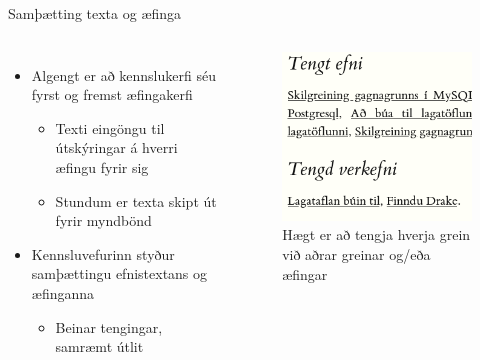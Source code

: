 \documentclass{beamer}
\begin{document}
\begin{frame}{Samþætting texta og æfinga}
    \begin{columns}
        \begin{itemize}
            \item Algengt er að kennslukerfi séu fyrst og fremst æfingakerfi
            \begin{itemize}
                \item Texti eingöngu til útskýringar á hverri æfingu fyrir sig
                \item Stundum er texta skipt út fyrir myndbönd
            \end{itemize}
            \item Kennsluvefurinn styður samþættingu efnistextans og æfinganna
            \begin{itemize}
                \item Beinar tengingar, samræmt útlit
            \end{itemize}
        \end{itemize}
        \begin{figure}
            \caption{Hægt er að tengja hverja grein við aðrar greinar og/eða æfingar}
            \includegraphics[width=\linewidth]{suggestions}
        \end{figure}
    \end{columns}
\end{frame}
\end{document}
